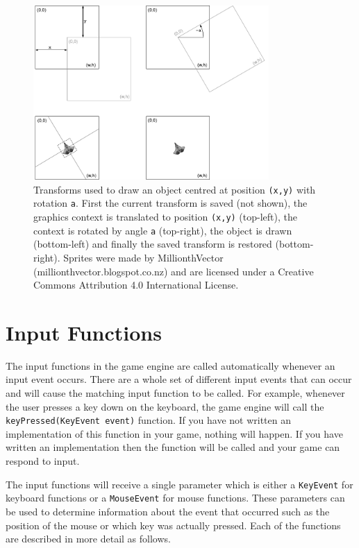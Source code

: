 \documentclass[a4paper, 10pt]{report}
\begin{document}
\begin{figure}[htbp]
\begin{center}
\includegraphics[width=0.80\textwidth]{Object}
\caption{ Transforms used to draw an object centred at position {\tt (x,y)} with rotation {\tt a}. First the current transform is saved (not shown), the graphics context is translated to position {\tt (x,y)} (top-left), the context is rotated by angle {\tt a} (top-right), the object is drawn (bottom-left) and finally the saved transform is restored (bottom-right). Sprites were made by MillionthVector (millionthvector.blogspot.co.nz) and are licensed under a Creative Commons Attribution 4.0 International License.}
\label{fig:Object-Draw}
\end{center}
\end{figure}
\vspace{2em}

\section{Input Functions}

The input functions in the game engine are called automatically whenever an input event occurs. There are a whole set of different input events that can occur and will cause the matching input function to be called. For example, whenever the user presses a key down on the keyboard, the game engine will call the {\tt keyPressed(KeyEvent event)} function. If you have not written an implementation of this function in your game, nothing will happen. If you have written an implementation then the function will be called and your game can respond to input.

The input functions will receive a single parameter which is either a {\tt KeyEvent} for keyboard functions or a {\tt MouseEvent} for mouse functions. These parameters can be used to determine information about the event that occurred such as the position of the mouse or which key was actually pressed. Each of the functions are described in more detail as follows.
\end{document}
